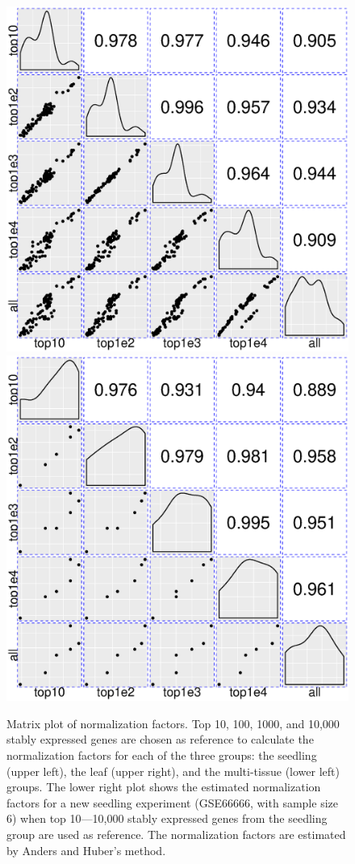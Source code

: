 \documentclass[letterpaper,12pt]{article}
\begin{document}
\begin{figure}[h!]
\begin{center}
		\includegraphics[scale=0.34]{Figures/norm3.eps}
		\includegraphics[scale=0.34]{Figures/norm4.eps}
		\caption{\label{fig:normfactor} Matrix plot of normalization factors. Top 10, 100, 1000, and 10,000 stably expressed genes are chosen as reference to calculate the normalization factors for each of the three groups: the seedling (upper left), the leaf (upper right), and the multi-tissue (lower left) groups. The lower right plot shows the estimated normalization factors for a new seedling experiment (GSE66666, with sample size 6) when top 10---10,000 stably expressed genes from the seedling group are used as reference. The normalization factors are estimated by Anders and Huber's method.}
	\end{center}
\end{figure}
\end{document}
